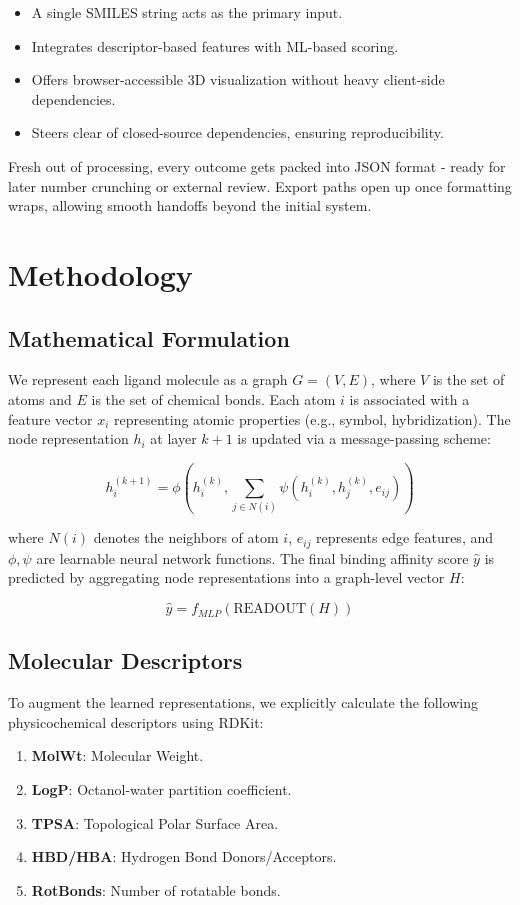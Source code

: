 \documentclass[conference]{IEEEtran}
\begin{document}
\begin{itemize}
\item A single SMILES string acts as the primary input.
\item Integrates descriptor-based features with ML-based scoring.
\item Offers browser-accessible 3D visualization without heavy client-side dependencies.
\item Steers clear of closed-source dependencies, ensuring reproducibility.
\end{itemize}
Fresh out of processing, every outcome gets packed into JSON format - ready for later number crunching or external review. Export paths open up once formatting wraps, allowing smooth handoffs beyond the initial system.

\section{Methodology}

\subsection{Mathematical Formulation}
We represent each ligand molecule as a graph $G=(V,E)$, where $V$ is the set of atoms and $E$ is the set of chemical bonds. Each atom $i$ is associated with a feature vector $x_i$ representing atomic properties (e.g., symbol, hybridization).
The node representation $h_i$ at layer $k+1$ is updated via a message-passing scheme:

\begin{equation}
h_i^{(k+1)} = \phi \left( h_i^{(k)}, \sum_{j \in N(i)} \psi(h_i^{(k)}, h_j^{(k)}, e_{ij}) \right)
\end{equation}

where $N(i)$ denotes the neighbors of atom $i$, $e_{ij}$ represents edge features, and $\phi, \psi$ are learnable neural network functions.
The final binding affinity score $\hat{y}$ is predicted by aggregating node representations into a graph-level vector $H$:

\begin{equation}
\hat{y} = f_{MLP}(\text{READOUT}(H))
\end{equation}

\subsection{Molecular Descriptors}
To augment the learned representations, we explicitly calculate the following physicochemical descriptors using RDKit:
\begin{enumerate}
    \item \textbf{MolWt}: Molecular Weight.
    \item \textbf{LogP}: Octanol-water partition coefficient.
    \item \textbf{TPSA}: Topological Polar Surface Area.
    \item \textbf{HBD/HBA}: Hydrogen Bond Donors/Acceptors.
    \item \textbf{RotBonds}: Number of rotatable bonds.
\end{enumerate}
\end{document}
